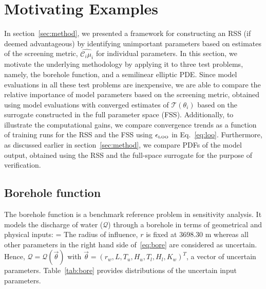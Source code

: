 \section{Motivating Examples}
\label{sec:examples}

In section~\ref{sec:method}, we presented a framework for constructing
an RSS (if deemed advantageous) by identifying unimportant parameters based on 
estimates of the screening metric, $\widehat{\mathcal{C}_i\mu_i}$
for individual parameters.
In this section, we motivate the underlying methodology by applying it to three
test problems,
namely, the borehole function, and a semilinear elliptic PDE.
Since model evaluations in all these test
problems are inexpensive, we are able to compare the relative importance of
model parameters based
on the screening metric, obtained using model evaluations with 
converged estimates of $\mathcal{T}(\theta_i)$ based on the surrogate constructed in the
full parameter space (FSS). Additionally, to illustrate the computational gains, 
we compare
convergence trends as a function of training runs for the RSS and the FSS using 
$\epsilon_{\mbox{\tiny LOO}}$ in Eq.~\ref{eq:loo}. 
Furthermore, as discussed earlier in section~\ref{sec:method}, we compare
PDFs of the model output, obtained using the RSS and the full-space surrogate for
the purpose of verification. 

\subsection{Borehole function}

The borehole function is a benchmark reference problem in sensitivity analysis.
It models the discharge of water ($\mathcal{Q}$) through a borehole in terms of
geometrical and physical inputs:
\be
{} = 
\label{eq:bore}
\ee
The radius of influence, $r$ is fixed at 3698.30 m whereas all other parameters
in the right hand side of~\eqref{eq:bore} are considered 
as uncertain. Hence, $\mathcal{Q} = \mathcal{Q}(\vec{\theta})$ with 
 $\vec{\theta} = (r_w, L, T_u, H_u, T_l, H_l, K_w)^T$, a vector of
 uncertain parameters. Table~\ref{tab:bore} provides distributions of the
 uncertain input parameters. 

